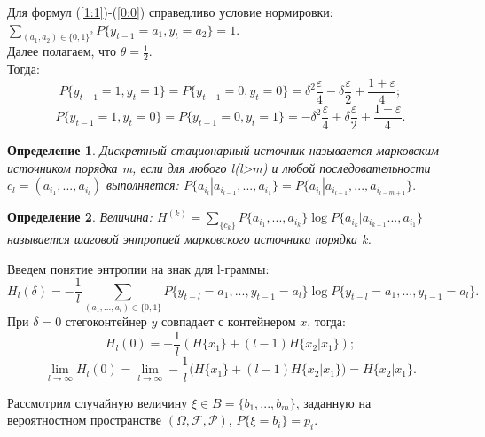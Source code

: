 \documentclass[a4paper,12pt]{article}
\theoremstyle{plain}
\newtheorem{definition}{Определение}[section]
\begin{document}
Для формул (\ref{1:1})-(\ref{0:0}) справедливо условие нормировки:\\
$ \sum_{(a_1, a_2)\in \{0, 1\}^2}P\{y_{t-1}=a_1, y_t=a_2\} =1.$\\
Далее полагаем, что $\theta=\frac{1}{2}$.\\
Тогда: 
\begin{equation}
	P\{y_{t-1}=1, y_t = 1 \}=P\{y_{t-1}=0, y_t = 0 \}= \delta^2\frac{\varepsilon}{4}-\delta\frac{\varepsilon}{2}+\frac{1+\varepsilon}{4};
\end{equation}
\begin{equation}
	P\{y_{t-1}=1, y_t = 0 \}=P\{y_{t-1}=0, y_t = 1 \}= -\delta^2\frac{\varepsilon}{4}+\delta\frac{\varepsilon}{2}+\frac{1-\varepsilon}{4}.
\end{equation}
\begin{definition}
	\cite{duhin} Дискретный стационарный источник называется марковским источником порядка m, если для любого l(l>m) и любой последовательности $c_l=(a_{i_1}, ..., a_{i_l})$ выполняется: $P\{a_{i_l}|a_{i_{l-1}}, ..., a_{i_1}\} = P\{a_{i_l}|a_{i_{l-1}}, ..., a_{i_{l-m+1}}\}.$
\end{definition}
\begin{definition}
	\cite{duhin} Величина: 
	$H^{(k)} = \sum_{\{c_k\}}P\{a_{i_1}, ..., a_{i_k}\} \log{P\{a_{i_k}|a_{i_{k-1}} ..., a_{i_1}\} }$ называется шаговой энтропией марковского источника порядка k.
\end{definition}

Введем понятие энтропии на знак для l-граммы:\\
\begin{equation}
	\label{entropy L}
	H_l(\delta) = -\frac{1}{l} \sum_{(a_1, ..., a_l)\in \{0, 1\}}P\{y_{t-l}=a_1,..., y_{t-1}=a_l\}\log{P\{y_{t-l}=a_1, ..., y_{t-1}=a_l\}}.
\end{equation}
При $\delta = 0$ стегоконтейнер $y$ совпадает с контейнером $x$, тогда:\\
\begin{equation}
	H_l(0)=-\frac{1}{l}(H\{x_1\}+(l-1)H\{x_2|x_1\});
\end{equation}
\begin{equation}
	\lim_{l \to \infty}H_l(0)= \lim_{l \to \infty}-\frac{1}{l}(H\{x_1\}+(l-1)H\{x_2|x_1\}) = H\{x_2|x_1\}.
\end{equation}

Рассмотрим случайную величину $\xi \in B=\{b_1,...,b_m\}$, заданную  на вероятностном пространстве $(\Omega,\mathcal{F},\mathcal{P} )$, $P\{\xi=b_i\}=p_i$.
\end{document}
